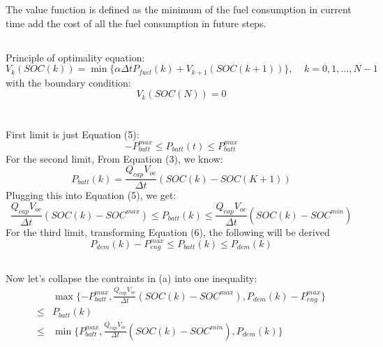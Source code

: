 \documentclass[12pt]{article}
\begin{document}
\section{}
\subsection{}
The value function is defined as the minimum of the fuel consumption in current time add the cost of all the fuel consumption in future steps.
\subsection{}
Principle of optimality equation:
\begin{equation}
V_k(SOC(k))=\min\{\alpha\Delta tP_{fuel}(k)+V_{k+1}(SOC(k+1))\},\ \ \ \ \ k=0,1,...,N-1
\end{equation}
with the boundary condition:
\begin{equation}
V_k(SOC(N))=0
\end{equation}
\section{}
\subsection{}
First limit is just Equation (5):
\begin{equation}
-P_{batt}^{max}\leq P_{batt}(t)\leq P_{batt}^{max}
\end{equation} 
For the second limit, From Equation (3), we know:
\begin{equation}
P_{batt}(k)=\frac{Q_{cap}V_{oc}}{\Delta t}(SOC(k)-SOC(K+1))
\end{equation}
Plugging this into Equation (5), we get:
\begin{equation}
\frac{Q_{cap}V_{oc}}{\Delta t}(SOC(k)-SOC^{max})\leq P_{batt}(k)\leq\frac{Q_{cap}V_{oc}}{\Delta t}(SOC(k)-SOC^{min})
\end{equation}
For the third limit, transforming Equation (6), the following will be derived
\begin{equation}
P_{dem}(k)-P_{eng}^{max}\leq P_{batt}(k)\leq P_{dem}(k)
\end{equation}
\subsection{}
Now let's collapse the contraints in (a) into one inequality:
\begin{equation}
\begin{array}{ll}
&\max\{-P_{batt}^{max},\frac{Q_{cap}V_{oc}}{\Delta t}(SOC(k)-SOC^{max}),P_{dem}(k)-P_{eng}^{max}\}\\\leq&P_{batt}(k)\\\leq& \min\{P_{batt}^{max},\frac{Q_{cap}V_{oc}}{\Delta t}(SOC(k)-SOC^{min}),P_{dem}(k)\}
\end{array}
\end{equation}
\newpage
\end{document}
